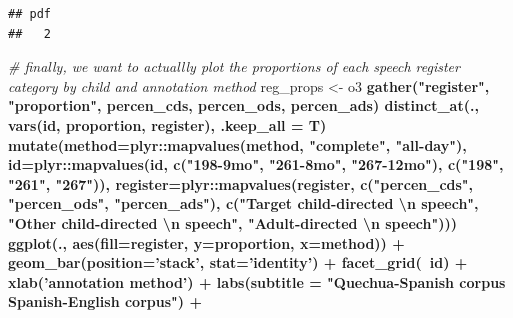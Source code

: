 \documentclass[
]{article}
\newenvironment{Shaded}{\begin{snugshade}}{\end{snugshade}}
\newcommand{\CharTok}[1]{\textcolor[rgb]{0.31,0.60,0.02}{#1}}
\newcommand{\CommentTok}[1]{\textcolor[rgb]{0.56,0.35,0.01}{\textit{#1}}}
\newcommand{\DataTypeTok}[1]{\textcolor[rgb]{0.13,0.29,0.53}{#1}}
\newcommand{\KeywordTok}[1]{\textcolor[rgb]{0.13,0.29,0.53}{\textbf{#1}}}
\newcommand{\NormalTok}[1]{#1}
\newcommand{\OperatorTok}[1]{\textcolor[rgb]{0.81,0.36,0.00}{\textbf{#1}}}
\newcommand{\StringTok}[1]{\textcolor[rgb]{0.31,0.60,0.02}{#1}}
\begin{document}
\begin{verbatim}
## pdf 
##   2
\end{verbatim}

\begin{Shaded}
\begin{Highlighting}[]
\CommentTok{# finally, we want to actuallly plot the proportions of each speech register category by child and annotation method}
\NormalTok{reg_props <-}\StringTok{ }\NormalTok{o3 }\OperatorTok{%
\StringTok{  }\KeywordTok{gather}\NormalTok{(}\StringTok{"register"}\NormalTok{, }\StringTok{"proportion"}\NormalTok{, percen_cds, percen_ods, percen_ads) }\OperatorTok{%
\StringTok{  }\KeywordTok{distinct_at}\NormalTok{(., }\KeywordTok{vars}\NormalTok{(id, proportion, register), }\DataTypeTok{.keep_all =}\NormalTok{ T) }\OperatorTok{%
\StringTok{  }\KeywordTok{mutate}\NormalTok{(}\DataTypeTok{method=}\NormalTok{plyr}\OperatorTok{::}\KeywordTok{mapvalues}\NormalTok{(method, }\StringTok{"complete"}\NormalTok{, }\StringTok{"all-day"}\NormalTok{),}
         \DataTypeTok{id=}\NormalTok{plyr}\OperatorTok{::}\KeywordTok{mapvalues}\NormalTok{(id, }\KeywordTok{c}\NormalTok{(}\StringTok{"198-9mo"}\NormalTok{, }\StringTok{"261-8mo"}\NormalTok{, }\StringTok{"267-12mo"}\NormalTok{), }\KeywordTok{c}\NormalTok{(}\StringTok{"198"}\NormalTok{, }\StringTok{"261"}\NormalTok{, }\StringTok{"267"}\NormalTok{)),}
         \DataTypeTok{register=}\NormalTok{plyr}\OperatorTok{::}\KeywordTok{mapvalues}\NormalTok{(register, }\KeywordTok{c}\NormalTok{(}\StringTok{"percen_cds"}\NormalTok{, }\StringTok{"percen_ods"}\NormalTok{, }\StringTok{"percen_ads"}\NormalTok{), }\KeywordTok{c}\NormalTok{(}\StringTok{"Target child-directed }\CharTok{\textbackslash{}n}\StringTok{ speech"}\NormalTok{, }\StringTok{"Other child-directed }\CharTok{\textbackslash{}n}\StringTok{ speech"}\NormalTok{, }\StringTok{"Adult-directed }\CharTok{\textbackslash{}n}\StringTok{ speech"}\NormalTok{))) }\OperatorTok{%
\StringTok{  }\KeywordTok{ggplot}\NormalTok{(., }\KeywordTok{aes}\NormalTok{(}\DataTypeTok{fill=}\NormalTok{register, }\DataTypeTok{y=}\NormalTok{proportion, }\DataTypeTok{x=}\NormalTok{method)) }\OperatorTok{+}
\StringTok{  }\KeywordTok{geom_bar}\NormalTok{(}\DataTypeTok{position=}\StringTok{'stack'}\NormalTok{, }\DataTypeTok{stat=}\StringTok{'identity'}\NormalTok{) }\OperatorTok{+}
\StringTok{  }\KeywordTok{facet_grid}\NormalTok{(}\OperatorTok{~}\NormalTok{id) }\OperatorTok{+}
\StringTok{  }\KeywordTok{xlab}\NormalTok{(}\StringTok{'annotation method'}\NormalTok{) }\OperatorTok{+}
\StringTok{   }\KeywordTok{labs}\NormalTok{(}\DataTypeTok{subtitle =} \StringTok{"Quechua-Spanish corpus                   Spanish-English corpus"}\NormalTok{) }\OperatorTok{+}
}}}}
\end{Highlighting}
\end{Shaded}
\end{document}
